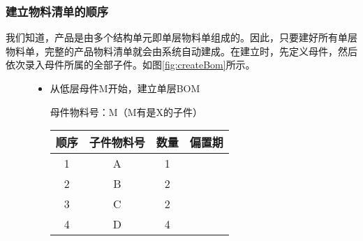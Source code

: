\subsubsection {建立物料清单的顺序}

        我们知道，产品是由多个结构单元即单层物料单组成的。因此，只要建好所有单层物料单，完整的产品物料清单就会由系统自动建成。在建立时，先定义母件，然后依次录入母件所属的全部子件。如图\ref{fig:createBom}所示。

        \begin{figure}[H]
            \centering

            \begin{itemize}
                \item 从低层母件M开始，建立单层BOM \vskip 3mm

                    \begin{minipage}{18em}
                        \footnotesize 母件物料号：M（M有是X的子件）
                        \vskip 2mm
                        \begin{tabular}{c|c|c|c}
                            顺序 & 子件物料号 & 数量 & 偏置期 \\ \hline
                            1 & A & 1 & \\
                            2 & B & 2 & \\
                            3 & C & 2 & \\
                            4 & D & 4 & \\
                        \end{tabular}
                    \end{minipage}
                    \begin{minipage}{14em}
                        \centering \footnotesize


\end{minipage}
\end{itemize}
\end{figure}

